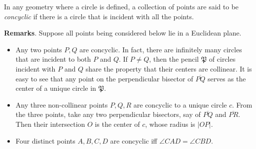 \documentclass[12pt]{article}
\begin{document}
In any geometry where a circle is defined, a collection of points are said to be \emph{concyclic} if there is a circle that is incident with all the points.

\textbf{Remarks}.
Suppose all points being considered below lie in a Euclidean plane.
\begin{itemize}
\item Any two points $P,Q$ are concyclic.  In fact, there are infinitely many circles that are incident to both $P$ and $Q$.  If $P\neq Q$, then the pencil $\mathfrak{P}$ of circles incident with $P$ and $Q$ share the property that their centers are collinear.  It is easy to see that any point on the perpendicular bisector of $\overline{PQ}$ serves as the center of a unique circle in $\mathfrak{P}$.
\item Any three non-collinear points $P,Q,R$ are concyclic to a unique circle $c$.  From the three points, take any two perpendicular bisectors, say of $\overline{PQ}$ and $\overline{PR}$.  Then their intersection $O$ is the center of $c$, whose radius is $|OP|$.
\item Four distinct points $A,B,C,D$ are concyclic iff $\angle CAD=\angle CBD$.
\end{itemize}
\end{document}
